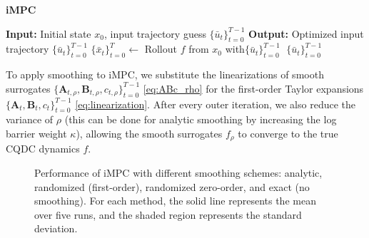 \begin{algorithm}
\caption{\textbf{iMPC}}\label{alg:impc}
\textbf{Input:} Initial state $x_0$, input trajectory guess $\{\bar{u}_t\}_{t=0}^{T-1}$\;
\textbf{Output:} Optimized input trajectory $\{\bar{u}_t\}_{t=0}^{T-1}$ \;
$\{\bar{x}_t\}_{t=0}^T\leftarrow$ Rollout $f$ from $x_0$ with$\{\bar{u}_t\}_{t=0}^{T-1}$\;
\algorithmicreturn $\; \{\bar{u}_t\}_{t=0}^{T-1}$
\end{algorithm}

To apply smoothing to iMPC, we substitute the linearizations of smooth surrogates $\{\mathbf{A}_{t,\rho},\mathbf{B}_{t,\rho},c_{t,\rho}\}^{T-1}_{t=0}$ \eqref{eq:ABc_rho} for the first-order Taylor expansions $\{\mathbf{A}_t,\mathbf{B}_t,c_t\}_{t=0}^{T-1}$ \eqref{eq:linearization}. After every outer iteration, we also reduce the variance of $\rho$ (this can be done for analytic smoothing by increasing the log barrier weight $\kappa$), allowing the smooth surrogates $f_\rho$ to converge to the true CQDC dynamics $f$.

\begin{figure}
\centering
{}
\caption{Performance of iMPC with different smoothing schemes: analytic, randomized (first-order), randomized zero-order, and exact (no smoothing). For each method, the solid line represents the mean over five runs, and the shaded region represents the standard deviation. }
\label{fig:trajoptperformance}
\end{figure}

